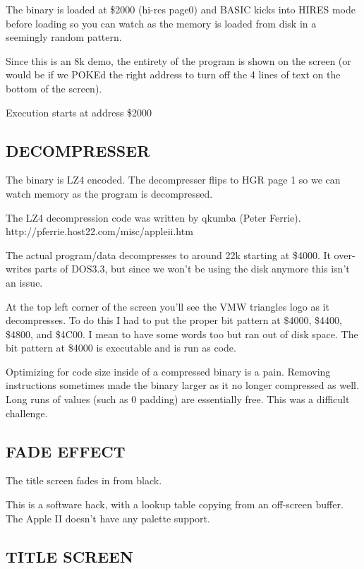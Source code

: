 \documentclass[twocolumn]{article}
\begin{document}
   The binary is loaded at \$2000 (hi-res page0) and BASIC kicks into
   HIRES mode before loading so you can watch as the memory is loaded
   from disk in a seemingly random pattern.

   Since this is an 8k demo, the entirety of the program is shown on
   the screen (or would be if we POKEd the right address to turn off
   the 4 lines of text on the bottom of the screen).

   Execution starts at address \$2000

\subsection{DECOMPRESSER}


   The binary is LZ4 encoded.  The decompresser flips to HGR page 1 so
   we can watch memory as the program is decompressed.

   The LZ4 decompression code was written by qkumba (Peter Ferrie).
	http://pferrie.host22.com/misc/appleii.htm

   The actual program/data decompresses to around 22k starting at \$4000.
   It over-writes parts of DOS3.3, but since we won't be using the disk 
   anymore this isn't an issue.

   At the top left corner of the screen you'll see the VMW triangles logo
   as it decompresses.  To do this I had to put the proper bit pattern
   at \$4000, \$4400, \$4800, and \$4C00.  I mean to have some words too
   but ran out of disk space.  The bit pattern at \$4000 is executable
   and is run as code.

   Optimizing for code size inside of a compressed binary is a pain.
   Removing instructions sometimes made the binary larger as it no longer
   compressed as well.  Long runs of values (such as 0 padding) are 
   essentially free.  This was a difficult challenge.

\subsection{FADE EFFECT}

  The title screen fades in from black.

  This is a software hack, with a lookup table copying from an off-screen
  buffer.  The Apple II doesn't have any palette support.

\subsection{TITLE SCREEN}
\end{document}
